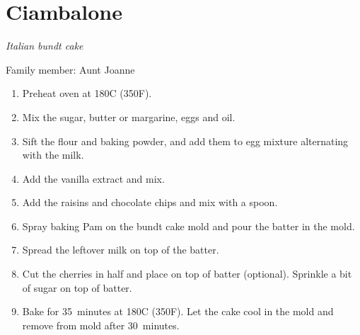 \chapter{Ciambalone}
\label{ch:ciambalone}


\textit{Italian bundt cake}

Family member: Aunt Joanne

\begin{enumerate}
    \item Preheat oven at 180\degree C (350\degree F).
    \item Mix the sugar, butter or margarine, eggs and oil.
    \item Sift the flour and baking powder, and add them to egg mixture alternating with the milk.
    \item Add the vanilla extract and mix.
    \item Add the raisins and chocolate chips and mix with a spoon.
    \item Spray baking Pam on the bundt cake mold and pour the batter in the mold.
    \item Spread the leftover milk on top of the batter.
    \item Cut the cherries in half and place on top of batter (optional). Sprinkle a bit of sugar on top of batter.
    \item Bake for 35~minutes at 180\degree C (350\degree F). Let the cake cool in the mold and remove from mold after 30~minutes.
\end{enumerate}


